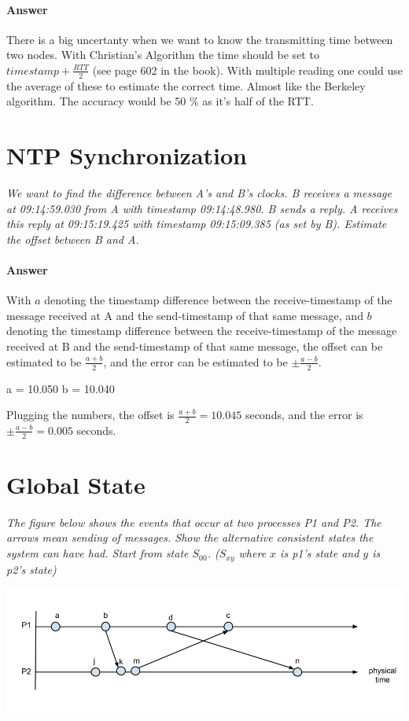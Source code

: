 \documentclass{article}
\newcommand{\singlequestion}[1]{\textit{#1}\bigskip}
\newcommand{\answer}{\paragraph{Answer}}
\begin{document}
\answer
There is a big uncertanty when we want to know the transmitting time between two nodes. With Christian's Algorithm the time should be set to $timestamp + \frac{RTT}{2}$ (see page 602 in the book).
With multiple reading one could use the average of these to estimate the correct time. Almost like the Berkeley algorithm.
The accuracy would be 50 \% as it's half of the RTT.

\section{NTP Synchronization}

\singlequestion{We want to find the difference between A's and B's clocks. B receives a message at 09:14:59.030 from A with timestamp 09:14:48.980. B sends a reply. A receives this reply at 09:15:19.425 with timestamp 09:15:09.385 (as set by B). Estimate the offset between B and A.}

\answer
With $ a $ denoting the timestamp difference between the receive-timestamp of the message received at A and the send-timestamp of that same message, and $ b $ denoting the timestamp difference between the receive-timestamp of the message received at B and the send-timestamp of that same message, the offset can be estimated to be $ \frac{a + b}{2} $, and the error can be estimated to be $ \pm \frac{a - b}{2} $.

a = 10.050
b = 10.040

Plugging the numbers, the offset is $ \frac{a + b}{2} = 10.045 $ seconds, and the error is $ \pm \frac{a - b}{2} = 0.005 $ seconds.

\section{Global State}

\singlequestion{The figure below shows the events that occur at two processes P1 and P2. The arrows mean sending of messages. Show the alternative consistent states the system can have had. Start from state $ S_{00} $. ($ S_{xy} $ where $ x $ is p1's state and $ y $ is p2's state)}

\includegraphics[width=\textwidth]{images/T3-3.png}
\end{document}
